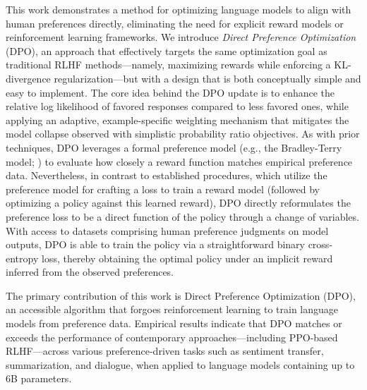 This work demonstrates a method for optimizing language models to align with human preferences directly, eliminating the need for explicit reward models or reinforcement learning frameworks. We introduce \textit{Direct Preference Optimization} (DPO), an approach that effectively targets the same optimization goal as traditional RLHF methods—namely, maximizing rewards while enforcing a KL-divergence regularization—but with a design that is both conceptually simple and easy to implement. The core idea behind the DPO update is to enhance the relative log likelihood of favored responses compared to less favored ones, while applying an adaptive, example-specific weighting mechanism that mitigates the model collapse observed with simplistic probability ratio objectives. As with prior techniques, DPO leverages a formal preference model (e.g., the Bradley-Terry model; \cite{bradley1952rankanalysis}) to evaluate how closely a reward function matches empirical preference data. Nevertheless, in contrast to established procedures, which utilize the preference model for crafting a loss to train a reward model (followed by optimizing a policy against this learned reward), DPO directly reformulates the preference loss to be a direct function of the policy through a change of variables. With access to datasets comprising human preference judgments on model outputs, DPO is able to train the policy via a straightforward binary cross-entropy loss, thereby obtaining the optimal policy under an implicit reward inferred from the observed preferences.

The primary contribution of this work is Direct Preference Optimization (DPO), an accessible algorithm that forgoes reinforcement learning to train language models from preference data. Empirical results indicate that DPO matches or exceeds the performance of contemporary approaches—including PPO-based RLHF—across various preference-driven tasks such as sentiment transfer, summarization, and dialogue, when applied to language models containing up to 6B parameters.

